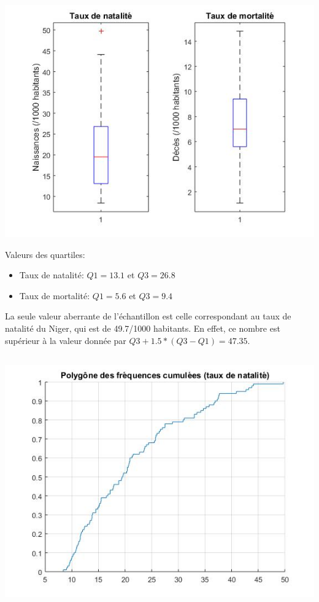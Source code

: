 \documentclass[a4paper,10pt]{article}
\begin{document}
\begin{center}
	\includegraphics[scale=0.5]{Figure2.jpg}
\end{center}



Valeurs des quartiles: 
 \begin{itemize}
 	\item Taux de natalité: $Q1=13.1$ et $Q3=26.8$
 	\item Taux de mortalité: $Q1=5.6$ et $Q3=9.4$
 \end{itemize} 

La seule valeur aberrante de l'échantillon est celle correspondant au taux de natalité du Niger, qui est de 49.7/1000 habitants. En effet, ce nombre est supérieur à la valeur donnée par $Q3+1.5*(Q3-Q1)=47.35$.

\subsection{ }

\begin{center}
	\includegraphics[scale=0.5]{Figure3.jpg}
\end{center}
\end{document}

